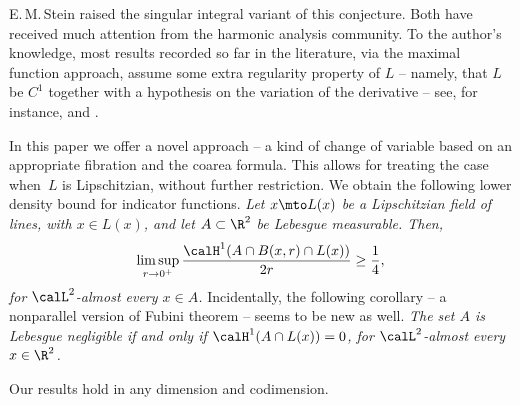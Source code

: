 \par
E.\,M.\,Stein raised the singular integral variant of this conjecture.
Both have received much attention from the harmonic analysis community.
To the author's knowledge, most results recorded so far in the literature, via the maximal function approach, assume some extra regularity property of $L$ -- namely, that $L$ be $C^1$ together with a hypothesis on the variation of the derivative -- see, for instance, \cite{BOU.89} and \cite{LAC.LI.10}.
\par
In this paper we offer a novel approach -- a kind of change of variable based on an appropriate fibration and the coarea formula.
This allows for treating the case when~$L$ is Lipschitzian, without further restriction.
We obtain the following lower density bound for indicator functions.
{\it
Let $x \mto L(x)$ be a Lipschitzian field of lines, with $x \in L(x)$, and let $A \subset \R^2$ be Lebesgue measurable.
Then,\vspace*{-3pt}
\begin{equation*}
\limsup_{r \to 0^+} \frac{\calH^1(A \cap B(x,r)\cap L(x))}{2r} \geq \frac{1}{4},
\end{equation*}
for $\calL^2$-almost every $x \in A$.
}
Incidentally, the following corollary -- a nonparallel version of Fubini theorem -- seems to be new as well.
{\it
The set $A$ is Lebesgue negligible if and only if $\calH^1(A \cap L(x))=0$, for $\calL^2$-almost every $x \in \R^2$.
}
\par
Our results hold in any dimension and codimension.

\nocite{BRU.71}
